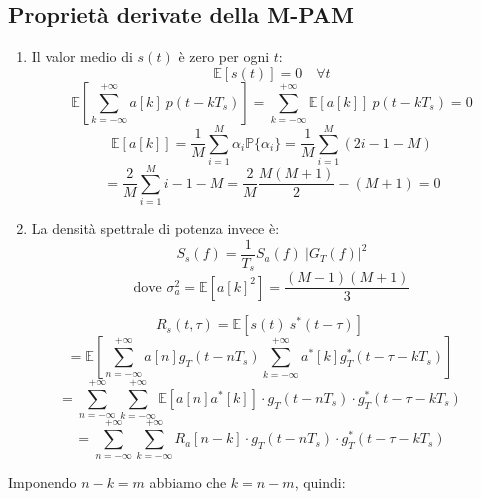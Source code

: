\subsection*{Proprietà derivate della M-PAM}
\begin{enumerate}
    \item Il valor medio di \( s(t) \) è zero per ogni \( t \):
          \begin{equation*}
              \mathbb{E}\left[ s(t) \right] = 0 \quad \forall t
          \end{equation*}
          \begin{equation*}
              \mathbb{E} \left[ \sum_{k=-\infty}^{+\infty} a[k] \ p(t-kT_s) \right] = \sum_{k=-\infty}^{+\infty} \mathbb{E}\left[a[k]\right]\ p(t-kT_s) = 0
          \end{equation*}
          \begin{equation*}
              \mathbb{E}\left[a[k]\right] = \frac{1}{M} \sum_{i=1}^{M} \alpha_i \mathbb{P}\{\alpha_i\} = \frac{1}{M} \sum_{i=1}^{M} (2i - 1 - M)
          \end{equation*}
          \begin{equation*}
              = \frac{2}{M} \sum_{i=1}^{M} i - 1 - M = \frac{2}{M} \frac{M(M+1)}{2} - (M+1) = 0
          \end{equation*}

    \item La densità spettrale di potenza invece è:
          \begin{equation*}
              S_s(f) = \frac{1}{T_s} S_a(f) \ |G_T(f)|^2
          \end{equation*}
          \begin{equation*}
              \text{dove } \sigma_a^2 = \mathbb{E}\left[ a\left[k\right]^2 \right] = \frac{(M-1)(M+1)}{3}
          \end{equation*}
\end{enumerate}

\[
    R_s(t,\tau) = \mathbb{E}[s(t) \ s^*(t-\tau)]
\]
\[
    = \mathbb{E} \left[ \sum_{n=-\infty}^{+\infty} a\left[n\right] g_T(t - nT_s) \sum_{k=-\infty}^{+\infty} a^*\left[k\right] g_T^*(t - \tau - kT_s) \right]
\]
\[
    = \sum_{n=-\infty}^{+\infty} \sum_{k=-\infty}^{+\infty} \mathbb{E}[a\left[n\right] a^*\left[k\right]] \cdot g_T(t - nT_s) \cdot g_T^*(t - \tau - kT_s)
\]
\[
    = \sum_{n=-\infty}^{+\infty} \sum_{k=-\infty}^{+\infty} R_a\left[n-k\right] \cdot g_T(t - nT_s) \cdot g_T^*(t - \tau - kT_s)
\]

Imponendo \( n-k = m \) abbiamo che \( k = n-m \), quindi:

